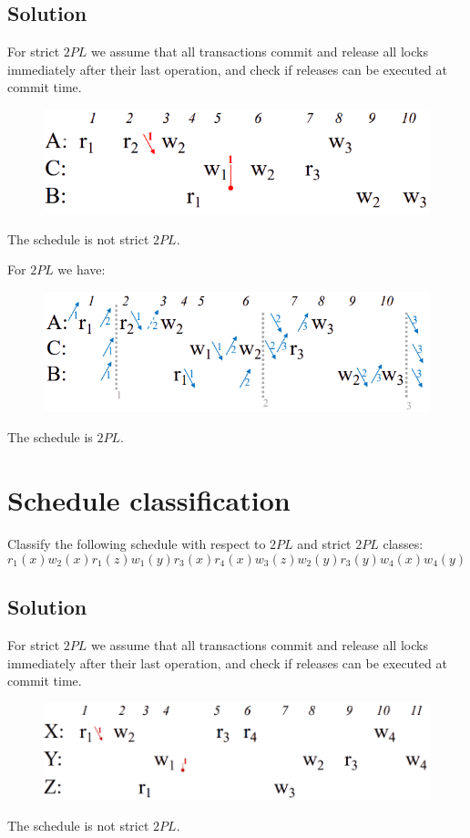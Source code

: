 \documentclass[12pt, a4paper]{report}
\newtheorem[style=M,bodystyle=\normalfont]{theorem}{Theorem}
\newtheorem[style=M,bodystyle=\normalfont]{corollary}{Corollary}
\newtheorem[style=M,bodystyle=\normalfont]{lemma}{Lemma}
\newtheorem[style=M,bodystyle=\normalfont]{definition}{Definition}
\begin{document}
    \subsection*{Solution}
        For strict $2PL$ we assume that all transactions commit and release all locks immediately after their last operation, and check if releases can be executed at commit time.
        \begin{figure}[H]
            \centering
            \includegraphics[width=1\linewidth]{images/2PL5.png}
        \end{figure}
        The schedule is not strict $2PL$.

        For $2PL$ we have: 
        \begin{figure}[H]
            \centering
            \includegraphics[width=1\linewidth]{images/2PL6.png}
        \end{figure}
        The schedule is $2PL$. 

    \newpage

    \section{Schedule classification}
        Classify the following schedule with respect to $2PL$ and strict $2PL$ classes: 
        \[r_1(x) w_2(x) r_1(z) w_1(y) r_3(x) r_4(x) w_3(z) w_2(y) r_3(y) w_4(x) w_4(y)\]
    \subsection*{Solution}
        For strict $2PL$ we assume that all transactions commit and release all locks immediately after their last operation, and check if releases can be executed at commit time.
        \begin{figure}[H]
            \centering
            \includegraphics[width=1\linewidth]{images/2PL7.png}
        \end{figure}
        The schedule is not strict $2PL$.
\end{document}

